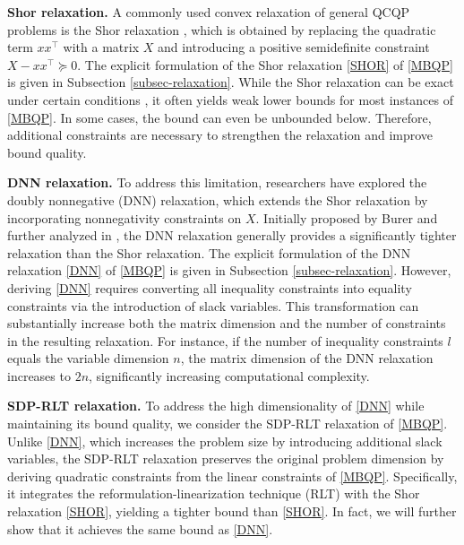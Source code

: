 \documentclass[11pt]{article}
\theoremstyle{plain}
\def\tb#1{\textbf{#1}}
\begin{document}
\noindent\tb{Shor relaxation.} A commonly used convex relaxation of general QCQP problems is the Shor relaxation \cite{shor1990dual}, which is obtained by replacing the quadratic term $xx^\top$ with a matrix $X$ and introducing a positive semidefinite constraint $X-xx^\top\succeq 0$. The explicit formulation of the Shor relaxation \eqref{SHOR} of \eqref{MBQP} is given in Subsection \ref{subsec-relaxation}. While the Shor relaxation can be exact under certain conditions \cite{wang2022tightness,burer2020exact}, it often yields weak lower bounds for most instances of \eqref{MBQP}. In some cases, the bound can even be unbounded below. Therefore, additional constraints are necessary to strengthen the relaxation and improve bound quality.
\medskip

\noindent\tb{DNN relaxation.} To address this limitation, researchers have explored the doubly nonnegative (DNN) relaxation, which extends the Shor relaxation by incorporating nonnegativity constraints on $X$. Initially proposed by Burer \cite{burer2009copositive, burer2010optimizing} and further analyzed in \cite{kim2022doubly, bomze2017fresh, RiNNAL}, the DNN relaxation generally provides a significantly tighter relaxation than the Shor relaxation. The explicit formulation of the DNN relaxation \eqref{DNN} of \eqref{MBQP} is given in Subsection \ref{subsec-relaxation}. However, deriving \eqref{DNN} requires converting all inequality constraints into equality constraints via the introduction of slack variables. This transformation can substantially increase both the matrix dimension and the number of constraints in the resulting relaxation. For instance, if the number of inequality constraints $l$ equals the variable dimension $n$, the matrix dimension of the DNN relaxation increases to $2n$, significantly increasing computational complexity.
\medskip

\noindent\tb{SDP-RLT relaxation.} To address the high dimensionality of \eqref{DNN} while maintaining its bound quality, we consider the SDP-RLT relaxation of \eqref{MBQP}. Unlike \eqref{DNN}, which increases the problem size by introducing additional slack variables, the SDP-RLT relaxation preserves the original problem dimension by deriving quadratic constraints from the linear constraints of \eqref{MBQP}. Specifically, it integrates the reformulation-linearization technique (RLT) \cite{sherali2007rlt,qiu2024polyhedral} with the Shor relaxation \eqref{SHOR}, yielding a tighter bound than \eqref{SHOR}. In fact, we will further show that it achieves the same bound as \eqref{DNN}.
\end{document}
